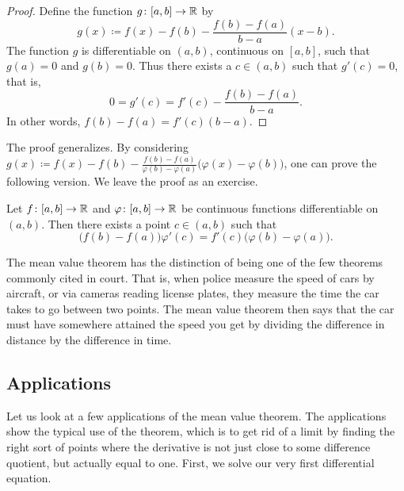 \begin{proof}
Define the
function $g \colon [a,b] \to {\mathbb{R}}$ by
\begin{equation*}
g(x) \coloneqq f(x)-f(b)-\frac{f(b)-f(a)}{b-a}(x-b) .
\end{equation*}
The function $g$ is differentiable on $(a,b)$,
continuous on $[a,b]$, such that $g(a) = 0$ and $g(b) = 0$.  Thus there exists
a
$c \in (a,b)$ such that $g'(c) = 0$, that is,
\begin{equation*}
0 = g'(c) = f'(c)-\frac{f(b)-f(a)}{b-a} .
\end{equation*}
In other words,
$f(b)-f(a) = f'(c)(b-a)$.
\end{proof}

The proof generalizes.  By considering
$g(x) \coloneqq
f(x)-f(b)-\frac{f(b)-f(a)}{\varphi(b)-\varphi(a)}\bigl(\varphi(x)-\varphi(b)\bigr)$,
one can prove the following version.  We leave the proof as an exercise.

\begin{thm} \label{thm:cauchymvt}
Let $f \colon [a,b] \to {\mathbb{R}}$ and $\varphi \colon [a,b] \to {\mathbb{R}}$ be continuous
functions
differentiable on $(a,b)$.  Then there exists a point $c \in (a,b)$
such that
\begin{equation*}
\bigl(f(b)-f(a)\bigr)\varphi'(c) = f'(c)\bigl(\varphi(b)-\varphi(a)\bigr) .
\end{equation*}
\end{thm}

The mean value theorem has the distinction of being one of the few theorems
commonly cited
in court.  That is, when police measure the speed of cars by aircraft, or
via cameras reading license plates, they 
measure the time the car takes to go between two points.
The mean value theorem then
says that the car must have somewhere attained the speed you get by dividing the
difference in distance by the difference in time.



\subsection{Applications}

Let us look at a few applications of the mean value theorem.
The applications show the typical use of the theorem, which is
to get rid of a limit by finding the right sort of points where the
derivative is not just close to some difference quotient, but actually
equal to one.
First, we solve our very first differential equation.

